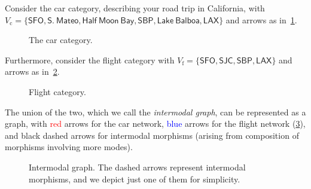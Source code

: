 \begin{example}
Consider the car category, describing your road trip in California, with $V_\mathrm{c}=\{\mathsf{SFO},\mathsf{S.}\ \mathsf{Mateo},\mathsf{Half} \ \mathsf{Moon}\ \mathsf{Bay},\mathsf{SBP},\mathsf{Lake}\ \mathsf{Balboa},\mathsf{LAX}\}$ and arrows as in~\cref{fig:carcat}.

\begin{figure}[h!]
\begin{center}
\end{center}
\caption{The car category. \label{fig:carcat}}
\end{figure}

Furthermore, consider the flight category with $V_\mathrm{f}=\{\mathsf{SFO},\mathsf{SJC},\mathsf{SBP},\mathsf{LAX}\}$ and arrows as in~\cref{fig:subcat}.


\begin{figure}[h!]
\begin{center}
\end{center}
\caption{Flight category. \label{fig:subcat}}
\end{figure}
The union of the two, which we call the \emph{intermodal graph}, can be represented as a graph, with \textcolor{red}{red} arrows for the car network, \textcolor{blue}{blue} arrows for the flight network (\cref{fig:intermodal}), and black dashed arrows for intermodal morphisms (arising from composition of morphisms involving more modes).

\begin{figure}[h!]
\begin{center}
\end{center}
\caption{Intermodal graph. The dashed arrows represent intermodal morphisms, and we depict just one of them for simplicity. \label{fig:intermodal}}
\end{figure}
\end{example}



